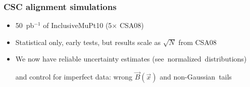 \documentclass[compress]{beamer}
\begin{document}
\begin{frame}
\frametitle{CSC alignment simulations}
\begin{itemize}
\item 50~pb$^{-1}$ of InclusiveMuPt10 (5$\times$ CSA08)
\item Statistical only, early tests, but results scale as $\sqrt{N}$ from CSA08
\item We now have reliable uncertainty estimates \mbox{(see normalized distributions)\hspace{-1 cm}}

and control for imperfect data: wrong $\vec{B}(\vec{x})$ and \mbox{non-Gaussian tails\hspace{-1 cm}}

\end{itemize}

\begin{columns}
\begin{tabular}{p{0.3\linewidth} p{0.3\linewidth} p{0.3\linewidth}}

\end{tabular}
\end{columns}
\end{frame}
\end{document}
